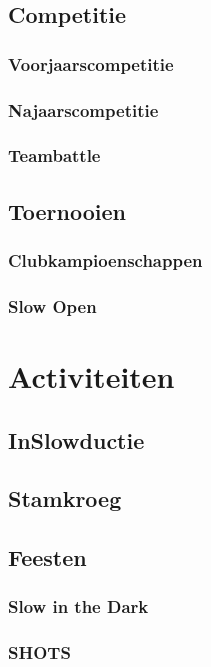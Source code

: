 \documentclass[]{article}
\begin{document}
\subsection{Competitie}
\subsubsection{Voorjaarscompetitie}

\subsubsection{Najaarscompetitie}

\subsubsection{Teambattle}

\subsection{Toernooien}
\subsubsection{Clubkampioenschappen}

\subsubsection{Slow Open}

\section{Activiteiten}
\subsection{InSlowductie}

\subsection{Stamkroeg}

\subsection{Feesten}
\subsubsection{Slow in the Dark}

\subsubsection{SHOTS}
\end{document}
